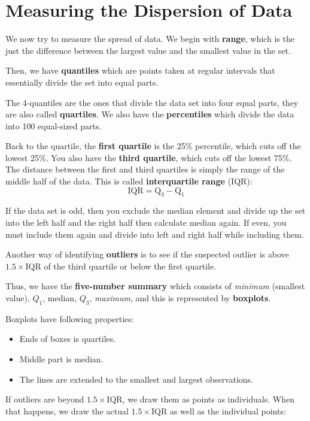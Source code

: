 \documentclass[12pt,a4paper]{article}
\begin{document}
\section{Measuring the Dispersion of Data}

We now try to measure the spread of data. We begin with \textbf{range}, which is the just the difference between the largest value and the smallest value in the set.

Then, we have \textbf{quantiles} which are points taken at regular intervals that essentially divide the set into equal parts. 

The 4-quantiles are the ones that divide the data set into four equal parts, they are also called \textbf{quartiles}. We also have the \textbf{percentiles} which divide the data into 100 equal-sized parts.

Back to the quartile, the \textbf{first quartile} is the 25\% percentile, which cuts off the lowest 25\%. You also have the \textbf{third quartile}, which cuts off the lowest 75\%. The distance between the first and third quartiles is simply the range of the middle half of the data. This is called \textbf{interquartile range} (IQR): $$\text{IQR} = \text{Q}_3 - \text{Q}_1$$ 

If the data set is odd, then you exclude the median element and divide up the set into the left half and the right half then calculate median again. If even, you must include them again and divide into left and right half while including them.

Another way of identifying \textbf{outliers} is to see if the suspected outlier is above $1.5 \times \text{IQR}$ of the third quartile or below the first quartile.

Thus, we have the \textbf{five-number summary} which consists of \textit{minimum} (smallest value), $Q_1$, median, $Q_3$, \textit{maximum}, and this is represented by \textbf{boxplots}.

Boxplots have following properties:
\begin{itemize}
    \item Ends of boxes is quartiles.
    \item Middle part is median.
    \item The lines are extended to the smallest and largest observations.
\end{itemize}

If outliers are beyond $1.5 \times \text{IQR}$, we draw them as points as individuals. When that happens, we draw the actual $1.5 \times \text{IQR}$ as well as the individual points:
\end{document}

